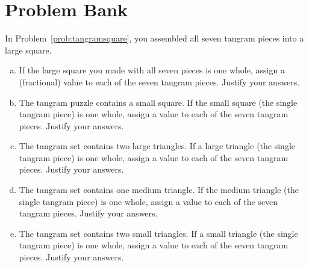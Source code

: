 \newpage







\newpage

\section{Problem Bank}

\begin{problem}[Tangrams]
In Problem~\ref{prob:tangramsquare}, you assembled all seven tangram pieces into a large square.

\begin{enumerate} [(a)]
 \item
If the large square you made with all seven pieces is one whole, assign a (fractional) value to each of the seven tangram pieces.  Justify your answers. \\

 
\item
The tangram puzzle contains a small square.  If the small square (the single tangram piece)  is one whole, assign a  value to each of the seven tangram pieces.  Justify your answers. \\


 \item
The tangram set contains two large triangles.  If a large triangle (the single tangram piece)  is one whole, assign a  value to each of the seven tangram pieces.  Justify your answers. \\



 \item
The tangram set contains one medium triangle.  If the medium triangle (the single tangram piece)  is one whole, assign a  value to each of the seven tangram pieces.  Justify your answers. \\
 


 \item
The tangram set contains two small triangles.  If a small triangle (the single tangram piece)  is one whole, assign a  value to each of the seven tangram pieces.  Justify your answers. \\
 



 \end{enumerate}
 \end{problem}



\bigskip


